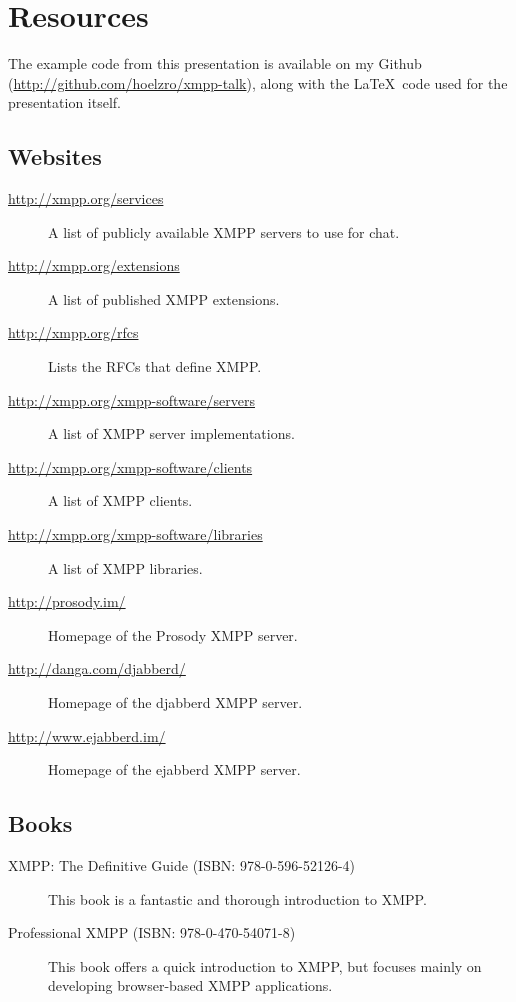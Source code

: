 \appendix
\section{Resources}

The example code from this presentation is available on my Github (\url{http://github.com/hoelzro/xmpp-talk}), along
with the \LaTeX\ code used for the presentation itself.

\subsection*{Websites}

\begin{description}
\item[\url{http://xmpp.org/services}] A list of publicly available XMPP servers to use for chat.
\item[\url{http://xmpp.org/extensions}] A list of published XMPP extensions.
\item[\url{http://xmpp.org/rfcs}] Lists the RFCs that define XMPP.
\item[\url{http://xmpp.org/xmpp-software/servers}] A list of XMPP server implementations.
\item[\url{http://xmpp.org/xmpp-software/clients}] A list of XMPP clients.
\item[\url{http://xmpp.org/xmpp-software/libraries}] A list of XMPP libraries.
\item[\url{http://prosody.im/}] Homepage of the Prosody XMPP server.
\item[\url{http://danga.com/djabberd/}] Homepage of the djabberd XMPP server.
\item[\url{http://www.ejabberd.im/}] Homepage of the ejabberd XMPP server.
\end{description}

\subsection*{Books}

\begin{description}
\item[XMPP: The Definitive Guide (ISBN: 978-0-596-52126-4)] This book is a fantastic and thorough introduction to XMPP.
\item[Professional XMPP (ISBN: 978-0-470-54071-8)] This book offers a quick introduction to XMPP, but focuses mainly on developing browser-based XMPP applications.
\end{description}


